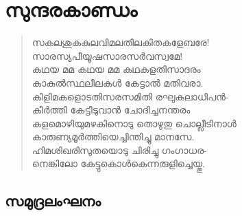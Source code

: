 
\chapter{സുന്ദരകാണ്ഡം}

\begin{verse}
സകലശുകകുലവിമലതിലകിതകളേബരേ!\\
സാരസ്യപീയൂഷസാരസര്‍വസ്വമേ!\\
കഥയ മമ കഥയ മമ കഥകളതിസാദരം\\
കാകുല്‍സ്ഥലീലകള്‍ കേട്ടാല്‍ മതിവരാ.\\
കിളിമകളൊടതിസരസമിതി രഘുകുലാധിപന്‍-\\
കീര്‍ത്തി കേട്ടീടുവാന്‍ ചോദിച്ചനന്തരം\\
കളമൊഴിയുമഴകിനൊടു തൊഴുതു ചൊല്ലീടിനാള്‍\\
കാരുണ്യമൂര്‍ത്തിയെച്ചിന്തിച്ചു മാനസേ.\\
ഹിമശിഖരിസുതയൊടു ചിരിച്ചു ഗംഗാധര-\\
നെങ്കിലോ കേട്ടുകൊള്‍കെന്നരുളിച്ചെയ്തു.
\end{verse}


\section{സമുദ്രലംഘനം}

